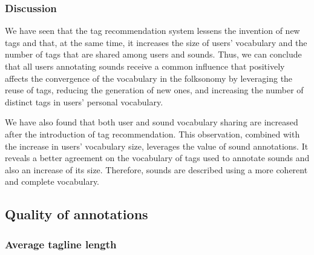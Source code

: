 \subsubsection{Discussion}

We have seen that the tag recommendation system lessens the invention of new tags and that, at the same time, it increases the size of users' vocabulary and the number of tags that are shared among users and sounds. Thus, we can conclude that all users annotating sounds receive a common influence that positively affects the convergence of the vocabulary in the folksonomy by leveraging the reuse of tags, reducing the generation of new ones, and increasing the number of distinct tags in users' personal vocabulary.

We have also found that both user and sound vocabulary sharing are increased after the introduction of tag recommendation. This observation, combined with the increase in users' vocabulary size, leverages the value of sound annotations. It reveals a better agreement on the vocabulary of tags used to annotate sounds and also an increase of its size. Therefore, sounds are described using a more coherent and complete vocabulary.


\subsection{Quality of annotations}
\label{impact:sec:results_quality_annotations}


\subsubsection{Average tagline length}
\label{impact:sec:length_of_tagline}

